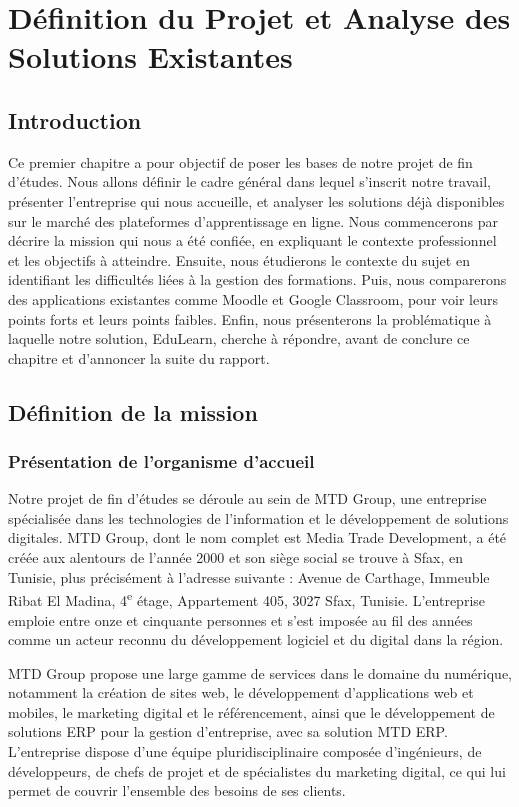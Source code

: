 \documentclass[12pt,a4paper]{report}
\begin{document}
\chapter{Définition du Projet et Analyse des Solutions Existantes}

\section{Introduction}
Ce premier chapitre a pour objectif de poser les bases de notre projet de fin d'études. Nous allons définir le cadre général dans lequel s'inscrit notre travail, présenter l'entreprise qui nous accueille, et analyser les solutions déjà disponibles sur le marché des plateformes d'apprentissage en ligne. Nous commencerons par décrire la mission qui nous a été confiée, en expliquant le contexte professionnel et les objectifs à atteindre. Ensuite, nous étudierons le contexte du sujet en identifiant les difficultés liées à la gestion des formations. Puis, nous comparerons des applications existantes comme Moodle et Google Classroom, pour voir leurs points forts et leurs points faibles. Enfin, nous présenterons la problématique à laquelle notre solution, EduLearn, cherche à répondre, avant de conclure ce chapitre et d'annoncer la suite du rapport.

\section{Définition de la mission}
\subsection{Présentation de l'organisme d'accueil}
Notre projet de fin d'études se déroule au sein de MTD Group, une entreprise spécialisée dans les technologies de l'information et le développement de solutions digitales. MTD Group, dont le nom complet est Media Trade Development, a été créée aux alentours de l'année 2000 et son siège social se trouve à Sfax, en Tunisie, plus précisément à l'adresse suivante : Avenue de Carthage, Immeuble Ribat El Madina, 4\textsuperscript{e} étage, Appartement 405, 3027 Sfax, Tunisie. L'entreprise emploie entre onze et cinquante personnes et s'est imposée au fil des années comme un acteur reconnu du développement logiciel et du digital dans la région.

MTD Group propose une large gamme de services dans le domaine du numérique, notamment la création de sites web, le développement d'applications web et mobiles, le marketing digital et le référencement, ainsi que le développement de solutions ERP pour la gestion d'entreprise, avec sa solution MTD ERP. L'entreprise dispose d'une équipe pluridisciplinaire composée d'ingénieurs, de développeurs, de chefs de projet et de spécialistes du marketing digital, ce qui lui permet de couvrir l'ensemble des besoins de ses clients.
\end{document}
